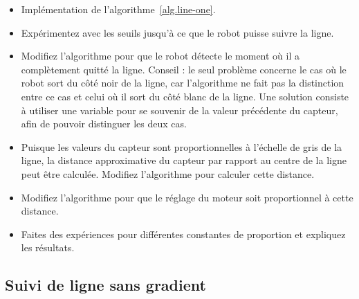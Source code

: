 \begin{framed}
\begin{itemize}
\item Implémentation de l'algorithme~\ref{alg.line-one}.
\item Expérimentez avec les seuils jusqu'à ce que le robot puisse suivre la ligne.
\item Modifiez l'algorithme pour que le robot détecte le moment où il a complètement quitté la ligne. Conseil : le seul problème concerne le cas où le robot sort du côté noir de la ligne, car l'algorithme ne fait pas la distinction entre ce cas et celui où il sort du côté blanc de la ligne. Une solution consiste à utiliser une variable pour se souvenir de la valeur précédente du capteur, afin de pouvoir distinguer les deux cas.
\end{itemize}
\end{framed}

\begin{framed}
\begin{itemize}
\item Puisque les valeurs du capteur sont proportionnelles à l'échelle de gris de la ligne, la distance approximative du capteur par rapport au centre de la ligne peut être calculée. Modifiez l'algorithme pour calculer cette distance.
\item Modifiez l'algorithme pour que le réglage du moteur soit proportionnel à cette distance.
\item Faites des expériences pour différentes constantes de proportion et expliquez les résultats.
\end{itemize}
\end{framed}

\subsection{Suivi de ligne sans gradient}\label{s.no-gradient}

